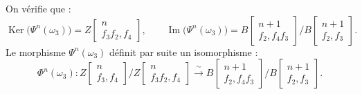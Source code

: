 \clearpage
{}%
\begingroup\small\setlength{\parskip}{0pt}\setlength{\emergencystretch}{2em}
On vérifie que :
\[
\operatorname{Ker}\bigl(\Psi^n(\omega_3)\bigr)
=Z\!\begin{bmatrix}n\\ f_3f_2,f_4\end{bmatrix},
\qquad
\operatorname{Im}\bigl(\Psi^n(\omega_3)\bigr)
=B\!\begin{bmatrix}n+1\\ f_2,f_4f_3\end{bmatrix}
 \Big/
 B\!\begin{bmatrix}n+1\\ f_2,f_3\end{bmatrix}.
\]
Le morphisme $\Psi^n(\omega_3)$ définit par suite un isomorphisme :
\[
\Phi^n(\omega_3)\colon
Z\!\begin{bmatrix}n\\ f_3,f_4\end{bmatrix}
 \Big/
Z\!\begin{bmatrix}n\\ f_3f_2,f_4\end{bmatrix}
\xrightarrow{\ \sim\ }
B\!\begin{bmatrix}n+1\\ f_2,f_4f_3\end{bmatrix}
 \Big/
B\!\begin{bmatrix}n+1\\ f_2,f_3\end{bmatrix}.
\]

